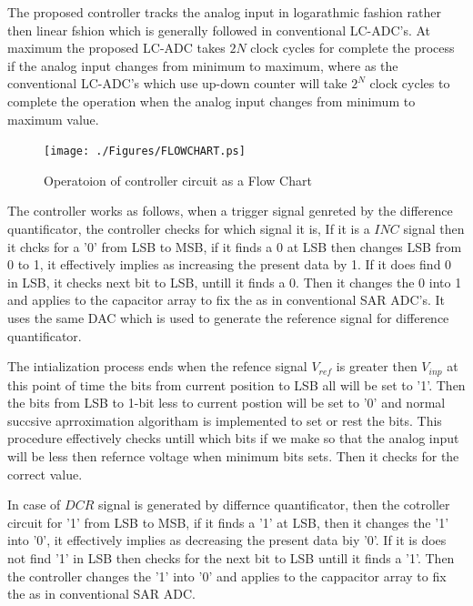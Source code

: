\documentclass[conference]{IEEEtran}
\begin{document}
	The proposed controller tracks the analog input in logarathmic fashion rather then linear fshion which is generally followed in conventional LC-ADC's. At maximum the proposed LC-ADC takes $2N$ clock cycles for complete the process if the analog input changes from minimum to maximum, where as the conventional LC-ADC's which use up-down counter will take $2^N$ clock cycles to complete the operation when the analog input changes from minimum to maximum value.\par

\begin{figure}[ht]
	\begin{center}
		\texttt{[image: ./Figures/FLOWCHART.ps]}
		\caption{Operatoion of controller circuit as a Flow Chart}
		\label{fig:FLOWCHART}
	\end{center}
\end{figure}

	The controller works as follows, when a trigger signal genreted by the difference quantificator, the controller checks for which signal it is, If it is a $INC$ signal then it chcks for a '0' from LSB to MSB, if it finds a 0 at LSB then changes LSB from 0 to 1, it effectively implies as increasing the present data by 1. If it does find 0 in LSB, it checks next bit to LSB, untill it finds a 0. Then it changes the 0 into 1 and applies to the capacitor array to fix the as in conventional SAR ADC's. It uses the same DAC which is used to generate the reference signal for difference quantificator.\par

	The intialization process ends when the refence signal $V_{ref}$ is greater then $V_{inp}$ at this point of time the bits from current position to LSB all will be set to '1'. Then the bits from LSB to 1-bit less to current postion will be set to '0' and normal succsive aprroximation algoritham is implemented to set or rest the bits. This procedure effectively checks untill which bits if we make so that the analog input will be less then refernce voltage when minimum bits sets. Then it checks for the correct value. \par

	In case of $DCR$ signal is generated by differnce quantificator, then the cotroller circuit for '1' from LSB to MSB, if it finds a '1' at LSB, then it changes the '1' into '0', it effectively implies as decreasing the present data biy '0'. If it is does not find '1' in LSB then checks for the next bit to LSB untill it finds a '1'. Then the controller changes the '1' into '0' and applies to the cappacitor array to fix the as in conventional SAR ADC. \par
\end{document}
